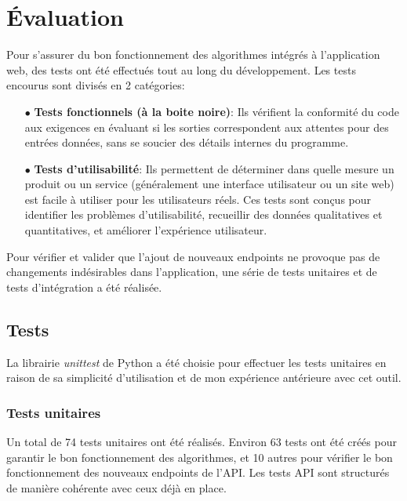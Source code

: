 \documentclass[11pt]{article}
\begin{document}
\newpage


\section{Évaluation}
Pour s'assurer du bon fonctionnement des algorithmes intégrés à l'application web, des tests ont été effectués tout au long du développement. Les tests encourus sont divisés en 2 catégories:\\

\begin{itemize}
	\item[$\bullet$] \textbf{Tests fonctionnels (à la boite noire)}: Ils vérifient la conformité du code aux exigences en évaluant si les sorties correspondent aux attentes pour des entrées données, sans se soucier des détails internes du programme.\\
	
	\item[$\bullet$] \textbf{Tests d'utilisabilité}: Ils permettent de déterminer dans quelle mesure un produit ou un service (généralement une interface utilisateur ou un site web) est facile à utiliser pour les utilisateurs réels. Ces tests sont conçus pour identifier les problèmes d'utilisabilité, recueillir des données qualitatives et quantitatives, et améliorer l'expérience utilisateur.\\
\end{itemize}

Pour vérifier et valider que l'ajout de nouveaux endpoints ne provoque pas de changements indésirables dans l'application, une série de tests unitaires et de tests d'intégration a été réalisée.

\subsection{Tests}
La librairie \textit{unittest} de Python a été choisie pour effectuer les tests unitaires en raison de sa simplicité d'utilisation et de mon expérience antérieure avec cet outil.

\subsubsection{Tests unitaires}
Un total de 74 tests unitaires ont été réalisés. Environ 63 tests ont été créés pour garantir le bon fonctionnement des algorithmes, et 10 autres pour vérifier le bon fonctionnement des nouveaux endpoints de l'API. Les tests API sont structurés de manière cohérente avec ceux déjà en place.\\
\end{document}

